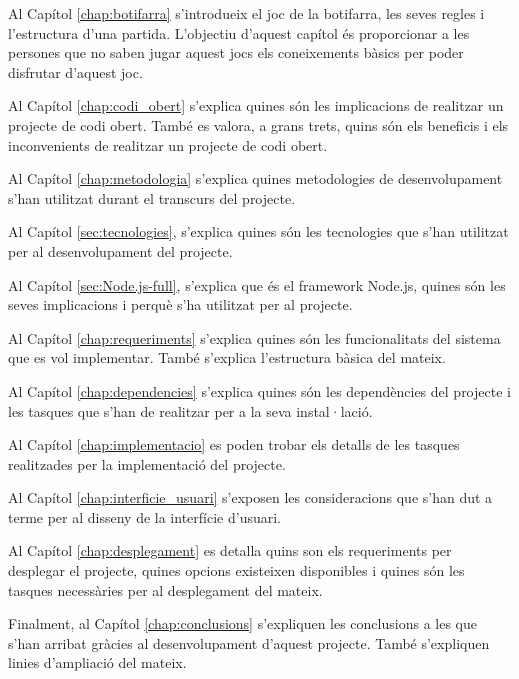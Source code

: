 Al Capítol \ref{chap:botifarra} s'introdueix el joc de la botifarra, les seves regles i l'estructura d'una partida. L'objectiu d'aquest capítol és proporcionar a les persones que no saben jugar aquest jocs els coneixements bàsics per poder disfrutar d'aquest joc. 

Al Capítol \ref{chap:codi_obert} s'explica quines són les implicacions de realitzar un projecte de codi obert. També es valora, a grans trets, quins són els beneficis i els inconvenients de realitzar un projecte de codi obert.

Al Capítol \ref{chap:metodologia} s'explica quines metodologies de desenvolupament s'han utilitzat durant el transcurs del projecte.

Al Capítol \ref{sec:tecnologies}, s'explica quines són les tecnologies que s'han utilitzat per al desenvolupament del projecte.

Al Capítol \ref{sec:Node.js-full}, s'explica que és el framework Node.js, quines són les seves implicacions i perquè s'ha utilitzat per al projecte. 

Al Capítol \ref{chap:requeriments} s'explica quines són les funcionalitats del sistema que es vol implementar. També s'explica l'estructura bàsica del mateix. 

Al Capítol \ref{chap:dependencies} s'explica quines són les dependències del projecte i les tasques que s'han de realitzar per a la seva instal·lació. 

Al Capítol \ref{chap:implementacio} es poden trobar els detalls de les tasques realitzades per la implementació del projecte. 

Al Capítol \ref{chap:interficie_usuari} s'exposen les consideracions que s'han dut a terme per al disseny de la interfície d'usuari.

Al Capítol \ref{chap:desplegament} es detalla quins son els requeriments per desplegar el projecte, quines opcions existeixen disponibles i quines són les tasques necessàries per al desplegament del mateix. 

Finalment, al Capítol \ref{chap:conclusions} s'expliquen les conclusions a les que s'han arribat gràcies al desenvolupament d'aquest projecte. També s'expliquen linies d'ampliació del mateix.
